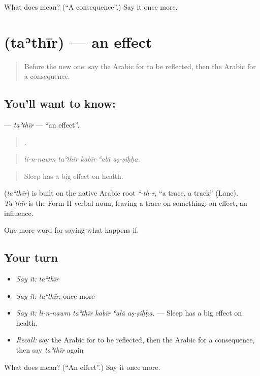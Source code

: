 \begin{tcolorbox}[breakable,colback=teal!4,colframe=teal!35!black,title={Before you move on}]
What does  mean? (\textquotedblleft{}A consequence\textquotedblright{}.) Say it once more.
\end{tcolorbox}
\section[\texorpdfstring{\ar{تأثير} (taʾthīr)}{تأثير (taʾthīr)}]{ (taʾthīr) — an effect}

\label{lesson:AR-C414-tathir}



\begin{quote}
Before the new one: say the Arabic for to be reflected, then the Arabic for a consequence.
\end{quote}

\subsection*{You'll want to know: }
\textbf{} — \emph{taʾthīr} — \textquotedblleft{}an effect\textquotedblright{}.

\begin{quote}
    .
\end{quote}

\begin{quote}
\emph{li-n-nawm taʾthīr kabīr ʿalā aṣ-ṣiḥḥa.}
\end{quote}

\begin{quote}
Sleep has a big effect on health.
\end{quote}

\begin{cousinweb}
\textbf{} (\emph{taʾthīr}) is built on the native Arabic root \emph{ʾ-th-r}, \textquotedblleft{}a trace, a track\textquotedblright{} (Lane). \emph{Taʾthīr} is the Form II verbal noun, leaving a trace on something: an effect, an influence.
\end{cousinweb}

\begin{grammarlens}[title={What you've built}]
One more word for saying what happens if.
\end{grammarlens}

\subsection*{Your turn}
\begin{itemize}
\raggedright
  \item \emph{Say it:} \emph{taʾthīr}
  \item \emph{Say it:} \emph{taʾthīr}, once more
  \item \emph{Say it:} \emph{li-n-nawm taʾthīr kabīr ʿalā aṣ-ṣiḥḥa.} — Sleep has a big effect on health.
  \item \emph{Recall:} say the Arabic for to be reflected, then the Arabic for a consequence, then say \emph{taʾthīr} again
\end{itemize}

\begin{tcolorbox}[breakable,colback=teal!4,colframe=teal!35!black,title={Before you move on}]
What does  mean? (\textquotedblleft{}An effect\textquotedblright{}.) Say it once more.
\end{tcolorbox}
